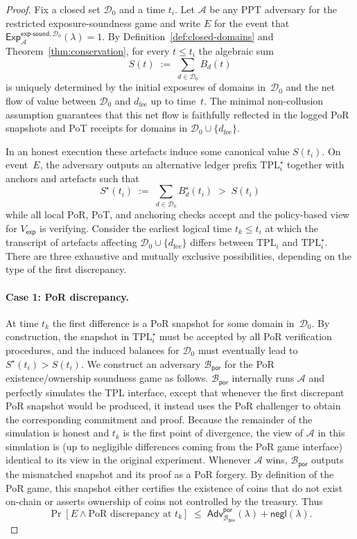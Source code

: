 \documentclass[11pt]{article}
\begin{document}
\begin{proof}
Fix a closed set $\mathcal{D}_0$ and a time $t_i$.
Let $\mathcal{A}$ be any PPT adversary for the restricted exposure-soundness game and
write $E$ for the event that
$\mathsf{Exp}^{\mathsf{exp\mbox{-}sound},\mathcal{D}_0}_{\mathcal{A}}(\lambda)=1$.
By Definition~\ref{def:closed-domains} and Theorem~\ref{thm:conservation}, for every
$t\leq t_i$ the algebraic sum
\[
  S(t) \;:=\; \sum_{d\in\mathcal{D}_0} B_d(t)
\]
is uniquely determined by the initial exposures of domains in~$\mathcal{D}_0$ and the
net flow of value between $\mathcal{D}_0$ and $d_{\mathrm{fee}}$ up to time~$t$.
The minimal non-collusion assumption guarantees that this net flow is faithfully
reflected in the logged PoR snapshots and PoT receipts for domains in
$\mathcal{D}_0 \cup\{d_{\mathrm{fee}}\}$.

In an honest execution these artefacts induce some canonical value $S(t_i)$.
On event~$E$, the adversary outputs an alternative ledger prefix $\mathrm{TPL}^\star_i$
together with anchors and artefacts such that
\[
  S^\star(t_i) \;:=\; \sum_{d\in\mathcal{D}_0} B_d^\star(t_i) \;>\; S(t_i)
\]
while all local PoR, PoT, and anchoring checks accept and the policy-based view for
$V_{\mathsf{exp}}$ is verifying.
Consider the earliest logical time $t_k\leq t_i$ at which the transcript of artefacts
affecting $\mathcal{D}_0\cup\{d_{\mathrm{fee}}\}$ differs between $\mathrm{TPL}_i$ and
$\mathrm{TPL}^\star_i$.
There are three exhaustive and mutually exclusive possibilities, depending on the
type of the first discrepancy.

\paragraph{Case 1: PoR discrepancy.}
At time $t_k$ the first difference is a PoR snapshot for some domain in~$\mathcal{D}_0$.
By construction, the snapshot in $\mathrm{TPL}^\star_i$ must be accepted by all PoR
verification procedures, and the induced balances for $\mathcal{D}_0$ must eventually
lead to $S^\star(t_i) > S(t_i)$.
We construct an adversary $\mathcal{B}_{\mathsf{por}}$ for the PoR existence/ownership
soundness game as follows.
$\mathcal{B}_{\mathsf{por}}$ internally runs $\mathcal{A}$ and perfectly simulates
the TPL interface, except that whenever the first discrepant PoR snapshot would be
produced, it instead uses the PoR challenger to obtain the corresponding commitment
and proof.
Because the remainder of the simulation is honest and $t_k$ is the first point of
divergence, the view of $\mathcal{A}$ in this simulation is (up to negligible
differences coming from the PoR game interface) identical to its view in the
original experiment.
Whenever $\mathcal{A}$ wins, $\mathcal{B}_{\mathsf{por}}$ outputs the mismatched
snapshot and its proof as a PoR forgery.
By definition of the PoR game, this snapshot either certifies the existence of
coins that do not exist on-chain or asserts ownership of coins not controlled by
the treasury.
Thus
\[
  \Pr[E \wedge \text{PoR discrepancy at }t_k]
  \;\leq\;
  \mathsf{Adv}^{\mathsf{por}}_{\mathcal{B}_{\mathsf{por}}}(\lambda) + \mathsf{negl}(\lambda).
\]


\end{proof}
\end{document}
